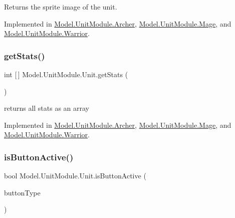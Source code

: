 Returns the sprite image of the unit. 

Implemented in \hyperlink{class_model_1_1_unit_module_1_1_archer_a2a400bdeef5aaaa34ffe6428ecaaf2c2}{Model.\+Unit\+Module.\+Archer}, \hyperlink{class_model_1_1_unit_module_1_1_mage_a1b771ad25cbaf34997af030b867a5131}{Model.\+Unit\+Module.\+Mage}, and \hyperlink{class_model_1_1_unit_module_1_1_warrior_afb4b568eb1d84ec9adca68e8ca8c79b4}{Model.\+Unit\+Module.\+Warrior}.

\hypertarget{interface_model_1_1_unit_module_1_1_unit_a32890c6e0bf19a58dde71cc4240576a8}{}\label{interface_model_1_1_unit_module_1_1_unit_a32890c6e0bf19a58dde71cc4240576a8} 
\subsubsection{\texorpdfstring{get\+Stats()}{getStats()}}
{\footnotesize\ttfamily int \mbox{[}$\,$\mbox{]} Model.\+Unit\+Module.\+Unit.\+get\+Stats (\begin{DoxyParamCaption}{ }\end{DoxyParamCaption})}

returns all stats as an array 

Implemented in \hyperlink{class_model_1_1_unit_module_1_1_archer_a1b339759429e0a031aadf2b3e2505e66}{Model.\+Unit\+Module.\+Archer}, \hyperlink{class_model_1_1_unit_module_1_1_mage_aa7cb642ad7aadd1161f1d95e501dfd23}{Model.\+Unit\+Module.\+Mage}, and \hyperlink{class_model_1_1_unit_module_1_1_warrior_ad058a6586b28d7d23075e557a99712aa}{Model.\+Unit\+Module.\+Warrior}.

\hypertarget{interface_model_1_1_unit_module_1_1_unit_a3931ef1523507e7261411dc79ee4e4af}{}\label{interface_model_1_1_unit_module_1_1_unit_a3931ef1523507e7261411dc79ee4e4af} 
\subsubsection{\texorpdfstring{is\+Button\+Active()}{isButtonActive()}}
{\footnotesize\ttfamily bool Model.\+Unit\+Module.\+Unit.\+is\+Button\+Active (\begin{DoxyParamCaption}\item[{\hyperlink{namespace_model_ac76b3489c9d704f49912608bd36cd0e7}{Button\+Type}}]{button\+Type }\end{DoxyParamCaption})}

